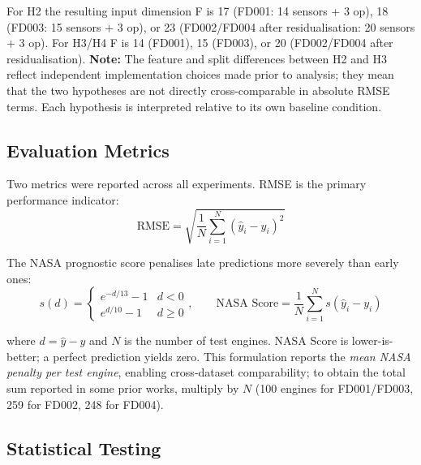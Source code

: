 \documentclass[review,12pt]{elsarticle}
\begin{document}
For H2 the resulting input dimension F is 17 (FD001: 14 sensors + 3 op), 18 (FD003: 15 sensors + 3 op), or 23 (FD002/FD004 after residualisation: 20 sensors + 3 op). For H3/H4 F is 14 (FD001), 15 (FD003), or 20 (FD002/FD004 after residualisation). \textbf{Note:} The feature and split differences between H2 and H3 reflect independent implementation choices made prior to analysis; they mean that the two hypotheses are not directly cross-comparable in absolute RMSE terms. Each hypothesis is interpreted relative to its own baseline condition.

\subsection{Evaluation Metrics}

Two metrics were reported across all experiments. RMSE is the primary performance indicator:
\begin{equation}
\text{RMSE} = \sqrt{\frac{1}{N}\sum_{i=1}^{N}(\hat{y}_i - y_i)^2}
\end{equation}

The NASA prognostic score penalises late predictions more severely than early ones:
\begin{equation}
s(d) = \begin{cases} e^{-d/13} - 1 & d < 0 \\ e^{d/10} - 1 & d \geq 0 \end{cases}, \qquad
\text{NASA Score} = \frac{1}{N}\sum_{i=1}^{N} s(\hat{y}_i - y_i)
\end{equation}

where $d = \hat{y} - y$ and $N$ is the number of test engines. NASA Score is lower-is-better; a perfect prediction yields zero. This formulation reports the \textit{mean NASA penalty per test engine}, enabling cross-dataset comparability; to obtain the total sum reported in some prior works, multiply by $N$ (100 engines for FD001/FD003, 259 for FD002, 248 for FD004).

\subsection{Statistical Testing}
\end{document}

